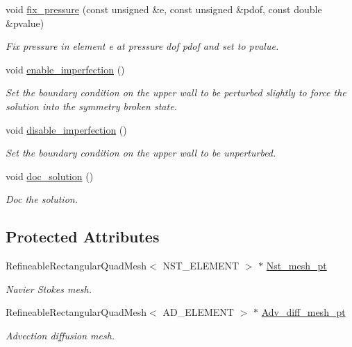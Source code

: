 \begin{DoxyCompactItemize}
void \hyperlink{classRefineableConvectionProblem_a3432fe8f8e4ba54d5e4c1ca7b3b233e2}{fix\+\_\+pressure} (const unsigned \&e, const unsigned \&pdof, const double \&pvalue)
\begin{DoxyCompactList}\small\item\em Fix pressure in element e at pressure dof pdof and set to pvalue. \end{DoxyCompactList}\item 
void \hyperlink{classRefineableConvectionProblem_aa97926281f88014ad45f43972184a77c}{enable\+\_\+imperfection} ()
\begin{DoxyCompactList}\small\item\em Set the boundary condition on the upper wall to be perturbed slightly to force the solution into the symmetry broken state. \end{DoxyCompactList}\item 
void \hyperlink{classRefineableConvectionProblem_a816f49163ff3ceb71aec4236aac10d84}{disable\+\_\+imperfection} ()
\begin{DoxyCompactList}\small\item\em Set the boundary condition on the upper wall to be unperturbed. \end{DoxyCompactList}\item 
void \hyperlink{classRefineableConvectionProblem_a8f6c4ead999c108394b6c6eb121daa51}{doc\+\_\+solution} ()
\begin{DoxyCompactList}\small\item\em Doc the solution. \end{DoxyCompactList}\end{DoxyCompactItemize}
\subsection*{Protected Attributes}
\begin{DoxyCompactItemize}
\item 
Refineable\+Rectangular\+Quad\+Mesh$<$ N\+S\+T\+\_\+\+E\+L\+E\+M\+E\+NT $>$ $\ast$ \hyperlink{classRefineableConvectionProblem_abc03f2233894203f55be5841857d2381}{Nst\+\_\+mesh\+\_\+pt}
\begin{DoxyCompactList}\small\item\em Navier Stokes mesh. \end{DoxyCompactList}\item 
Refineable\+Rectangular\+Quad\+Mesh$<$ A\+D\+\_\+\+E\+L\+E\+M\+E\+NT $>$ $\ast$ \hyperlink{classRefineableConvectionProblem_abfa55603a761cf57cb7de38beb8fa9ac}{Adv\+\_\+diff\+\_\+mesh\+\_\+pt}
\begin{DoxyCompactList}\small\item\em Advection diffusion mesh. \end{DoxyCompactList}\end{DoxyCompactItemize}
